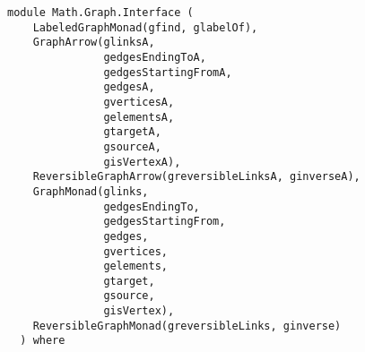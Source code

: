 \label{module:Math.Graph.Interface}
\haddockbeginheader
{\haddockverb\begin{verbatim}
module Math.Graph.Interface (
    LabeledGraphMonad(gfind, glabelOf), 
    GraphArrow(glinksA,
               gedgesEndingToA,
               gedgesStartingFromA,
               gedgesA,
               gverticesA,
               gelementsA,
               gtargetA,
               gsourceA,
               gisVertexA), 
    ReversibleGraphArrow(greversibleLinksA, ginverseA), 
    GraphMonad(glinks,
               gedgesEndingTo,
               gedgesStartingFrom,
               gedges,
               gvertices,
               gelements,
               gtarget,
               gsource,
               gisVertex), 
    ReversibleGraphMonad(greversibleLinks, ginverse)
  ) where\end{verbatim}}
\haddockendheader

